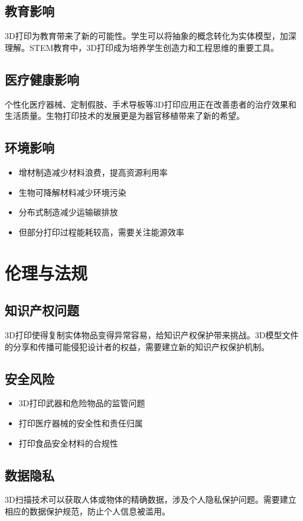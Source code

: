 \documentclass[12pt,UTF8]{ctexbook}
\begin{document}
\subsection{教育影响}
3D打印为教育带来了新的可能性。学生可以将抽象的概念转化为实体模型，加深理解。STEM教育中，3D打印成为培养学生创造力和工程思维的重要工具。

\subsection{医疗健康影响}
个性化医疗器械、定制假肢、手术导板等3D打印应用正在改善患者的治疗效果和生活质量。生物打印技术的发展更是为器官移植带来了新的希望。

\subsection{环境影响}
\begin{itemize}
\item 增材制造减少材料浪费，提高资源利用率
\item 生物可降解材料减少环境污染
\item 分布式制造减少运输碳排放
\item 但部分打印过程能耗较高，需要关注能源效率
\end{itemize}

\section{伦理与法规}

\subsection{知识产权问题}
3D打印使得复制实体物品变得异常容易，给知识产权保护带来挑战。3D模型文件的分享和传播可能侵犯设计者的权益，需要建立新的知识产权保护机制。

\subsection{安全风险}
\begin{itemize}
\item 3D打印武器和危险物品的监管问题
\item 打印医疗器械的安全性和责任归属
\item 打印食品安全材料的合规性
\end{itemize}

\subsection{数据隐私}
3D扫描技术可以获取人体或物体的精确数据，涉及个人隐私保护问题。需要建立相应的数据保护规范，防止个人信息被滥用。
\end{document}
